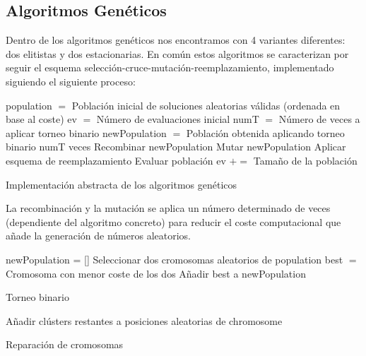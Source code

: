 \subsection{Algoritmos Genéticos}

Dentro de los algoritmos genéticos nos encontramos con 4 variantes diferentes: dos elitistas y dos estacionarias. En común estos algoritmos se caracterizan por seguir el esquema selección-cruce-mutación-reemplazamiento, implementado siguiendo el siguiente proceso: \\

\begin{algorithm}[H]
    \SetAlgoLined
        population $=$ Población inicial de soluciones aleatorias válidas (ordenada en base al coste) \;
        ev $=$ Número de evaluaciones inicial \;
        numT $=$ Número de veces a aplicar torneo binario \;
         {
            newPopulation $=$ Población obtenida aplicando torneo binario numT veces \;
            Recombinar newPopulation \;
            Mutar newPopulation \;
            Aplicar esquema de reemplazamiento \;
            Evaluar población \;
            ev $+=$ Tamaño de la población \;            
        }
    \caption{Implementación abstracta de los algoritmos genéticos}
\end{algorithm}

\vspace{\baselineskip}

La recombinación y la mutación se aplica un número determinado de veces (dependiente del algoritmo concreto) para reducir el coste computacional que añade la generación de números aleatorios. \\

\begin{algorithm}[H]
    \SetAlgoLined
        newPopulation = [] \;
         {
            Seleccionar dos cromosomas aleatorios de population \;
            best $=$ Cromosoma con menor coste de los dos \;
            Añadir best a newPopulation \;
        }
    \caption{Torneo binario}
\end{algorithm}

\vspace{\baselineskip}

\begin{algorithm}[H]
    \SetAlgoLined
         {
            Añadir clústers restantes a posiciones aleatorias de chromosome \;
        }
    \caption{Reparación de cromosomas}
\end{algorithm}

